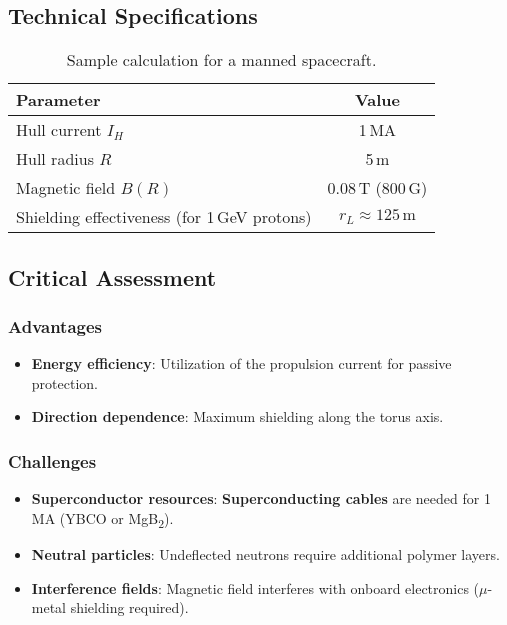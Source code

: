 \subsection{Technical Specifications}
\begin{table}[ht]
    \centering
    \begin{tabular}{lc}
        \toprule
        \textbf{Parameter} & \textbf{Value} \\
        \midrule
        Hull current $I_H$ & 1\,MA \\
        Hull radius $R$ & 5\,m \\
        Magnetic field $B(R)$ & 0.08\,T (800\,G) \\
        Shielding effectiveness (for 1\,GeV protons) & $r_L \approx 125\,\text{m}$ \\
        \bottomrule
    \end{tabular}
    \caption{Sample calculation for a manned spacecraft.}
    \label{tab:specs}
\end{table}

\subsection{Critical Assessment}
\subsubsection*{Advantages}
\begin{itemize}
    \item \textbf{Energy efficiency}: Utilization of the propulsion current for passive protection.
    \item \textbf{Direction dependence}: Maximum shielding along the torus axis.
\end{itemize}

\subsubsection*{Challenges}
\begin{itemize}
    \item \textbf{Superconductor resources}: \textbf{Superconducting cables} are needed for 1\,MA (YBCO or MgB\textsubscript{2}).
    \item \textbf{Neutral particles}: Undeflected neutrons require additional polymer layers.
    \item \textbf{Interference fields}: Magnetic field interferes with onboard electronics ($\mu$-metal shielding required).
\end{itemize}

